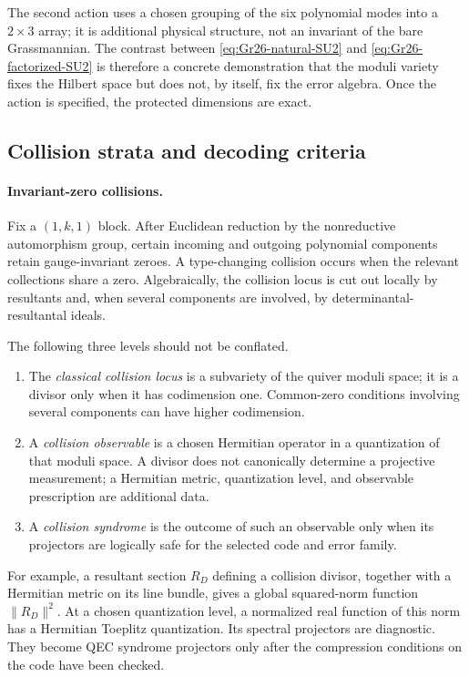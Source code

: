 \documentclass[11pt]{article}
\theoremstyle{definition}
\theoremstyle{remark}
\begin{document}
The second action uses a chosen grouping of the six polynomial modes into a $2\times3$ array; it is additional physical structure, not an invariant of the bare Grassmannian.  The contrast between \eqref{eq:Gr26-natural-SU2} and \eqref{eq:Gr26-factorized-SU2} is therefore a concrete demonstration that the moduli variety fixes the Hilbert space but does not, by itself, fix the error algebra.  Once the action is specified, the protected dimensions are exact.

\subsection{Collision strata and decoding criteria}

\paragraph{Invariant-zero collisions.}

Fix a $(1,k,1)$ block.  After Euclidean reduction by the nonreductive automorphism group, certain incoming and outgoing polynomial components retain gauge-invariant zeroes.  A type-changing collision occurs when the relevant collections share a zero.  Algebraically, the collision locus is cut out locally by resultants and, when several components are involved, by determinantal-resultantal ideals.

The following three levels should not be conflated.
\begin{enumerate}
\item The \emph{classical collision locus} is a subvariety of the quiver moduli space; it is a divisor only when it has codimension one.  Common-zero conditions involving several components can have higher codimension.
\item A \emph{collision observable} is a chosen Hermitian operator in a quantization of that moduli space.  A divisor does not canonically determine a projective measurement; a Hermitian metric, quantization level, and observable prescription are additional data.
\item A \emph{collision syndrome} is the outcome of such an observable only when its projectors are logically safe for the selected code and error family.
\end{enumerate}
For example, a resultant section $R_D$ defining a collision divisor, together with a Hermitian metric on its line bundle, gives a global squared-norm function $\|R_D\|^2$.  At a chosen quantization level, a normalized real function of this norm has a Hermitian Toeplitz quantization.  Its spectral projectors are diagnostic.  They become QEC syndrome projectors only after the compression conditions on the code have been checked.
\end{document}
